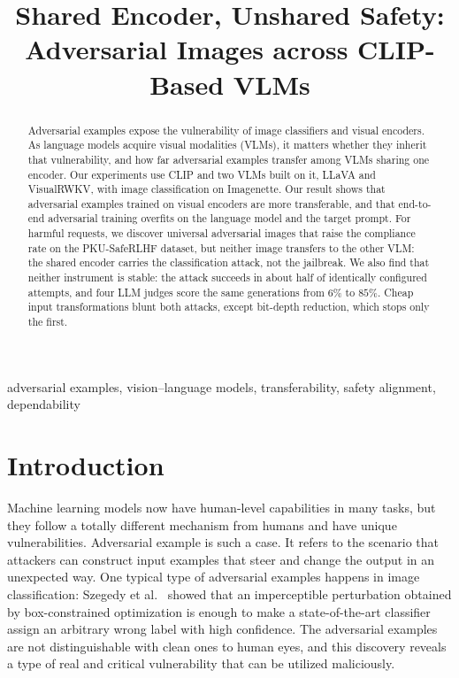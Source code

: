 \documentclass[conference]{IEEEtran}
\title{Shared Encoder, Unshared Safety:\\
Adversarial Images across CLIP-Based VLMs}
\author{\IEEEauthorblockN{Anonymous Submission}}
\begin{document}
\maketitle

\begin{abstract}
Adversarial examples expose the vulnerability of image classifiers and
visual encoders. As language models acquire visual modalities (VLMs), it
matters whether they inherit that vulnerability, and how far adversarial
examples transfer among VLMs sharing one encoder. Our experiments use CLIP
and two VLMs built on it, LLaVA and VisualRWKV, with image classification
on Imagenette. Our result shows that adversarial examples trained on
visual encoders are more transferable, and that end-to-end adversarial
training overfits on the language model and the target prompt. For harmful
requests, we discover universal adversarial images that raise the
compliance rate on the PKU-SafeRLHF dataset, but neither image transfers to
the other VLM: the shared encoder carries the classification attack, not
the jailbreak. We also find that neither instrument is stable: the attack
succeeds in about half of identically configured attempts, and four LLM
judges score the same generations from $6\%$ to $85\%$. Cheap input
transformations blunt both attacks, except bit-depth reduction, which stops
only the first.
\end{abstract}

\begin{IEEEkeywords}
adversarial examples, vision--language models, transferability, safety
alignment, dependability
\end{IEEEkeywords}

\section{Introduction}

Machine learning models now have human-level capabilities in many tasks,
but they follow a totally different mechanism from humans and have unique
vulnerabilities. Adversarial example is such a case. It refers to
the scenario that attackers can construct input examples that steer and
change the output in an unexpected way. One typical type of adversarial
examples happens in image classification: Szegedy et
al.~\cite{Szegedy2014Intriguing} showed that an imperceptible perturbation
obtained by box-constrained optimization is enough to make a
state-of-the-art classifier assign an arbitrary wrong label with high
confidence. The adversarial examples are not distinguishable with clean
ones to human eyes, and this discovery reveals a type of real and critical
vulnerability that can be utilized maliciously.
\end{document}

